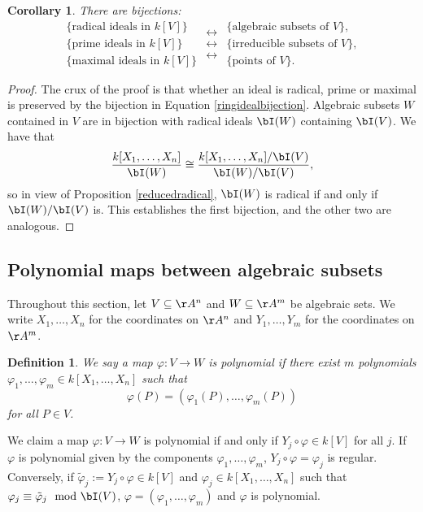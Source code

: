 \documentclass[12pt]{amsart}
\theoremstyle{plain}
\newtheorem{definition}[theorem]{Definition}
\newtheorem{corollary}[theorem]{Corollary}
\begin{document}
\begin{corollary}
There are bijections:
$$
\begin{array}{c}
\{\text{radical ideals in } k[V] \} \\
\{\text{prime ideals in } k[V] \} \\
\{\text{maximal ideals in } k[V] \} 
\end{array}
\begin{array}{c}
\longleftrightarrow \\
\longleftrightarrow \\
\longleftrightarrow  
\end{array}
\begin{array}{c}
\{\text{algebraic subsets of } V \}, \\
\{\text{irreducible subsets of } V\}, \\
\{\text{points of } V\} .
\end{array}
$$
\end{corollary}
\begin{proof}
The crux of the proof is that whether an ideal is radical, prime or maximal is preserved by the bijection in Equation \ref{ringidealbijection}.
Algebraic subsets $W$ contained in $V$ are in bijection with radical ideals $\bI(W)$ containing $\bI(V)$.
We have that
$$\frac{k[X_1, \ldots, X_n]}{\bI(W)} \cong \frac{k[X_1, \ldots, X_n]/\bI(V)}{\bI(W)/\bI(V)},$$
so in view of Proposition \ref{reducedradical}, $\bI(W)$ is radical if and only if $\bI(W)/\bI(V)$ is.
This establishes the first bijection, and the other two are analogous.
\end{proof}

\subsection{Polynomial maps between algebraic subsets}\label{polymaps}
Throughout this section, let $V \subseteq \AA^n$ and $W \subseteq \AA^m$ be algebraic sets.
We write $X_1, \ldots, X_n$ for the coordinates on $\AA^n$ and $Y_1, \ldots, Y_m$ for the coordinates on $\AA^m$.

\begin{definition}
We say a map $\varphi : V \to W$ is polynomial if there exist $m$ polynomials $\varphi_1, \ldots, \varphi_m \in k[X_1, \ldots, X_n]$ such that
$$\varphi(P) = (\varphi_1(P), \ldots, \varphi_m(P))$$
for all $P \in V$.
\end{definition}

We claim a map $\varphi: V \to W$ is polynomial if and only if $Y_j \circ \varphi \in k[V]$ for all $j$.
If $\varphi$ is polynomial given by the components $\varphi_1, \ldots, \varphi_m$, $Y_j \circ \varphi = \varphi_j$ is regular.
Conversely, if $\tilde \varphi_j := Y_j \circ \varphi \in k[V]$ and $\varphi_j \in k[X_1, \ldots, X_n]$ such that $\varphi_j \equiv \tilde \varphi_j \mod \bI(V)$, $\varphi = (\varphi_1, \ldots, \varphi_m)$ and $\varphi$ is polynomial.
\end{document}
